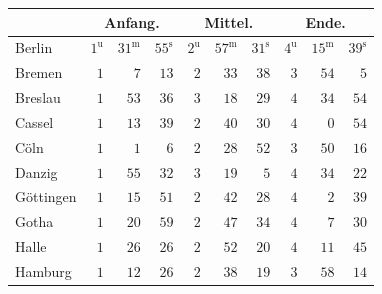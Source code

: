 \begin{center}\small\setlength{\tabcolsep}{3pt}
\begin{tabular}{l|rrr|rrr|rrr}
 &  \multicolumn{3}{c|}{Anfang.}  &  \multicolumn{3}{c|}{Mittel.}  &  \multicolumn{3}{c|}{Ende.}  \\
\hline
Berlin  &  $1^{\mathrm u}$  &  $31^{\mathrm m}$  &  $55^{\mathrm s}$  &  $2^{\mathrm u}$  &  $57^{\mathrm m}$  &  $31^{\mathrm s}$  &  $4^{\mathrm u}$  &  $15^{\mathrm m}$  &  $39^{\mathrm s}$  \\
Bremen  &  $1$  &  $7$  &  $13$  &  $2$  &  $33$  &  $38$  &  $3$  &  $54$  &  $5$  \\
Breslau  &  $1$  &  $53$  &  $36$  &  $3$  &  $18$  &  $29$  &  $4$  &  $34$  &  $54$  \\
Cassel  &  $1$  &  $13$  &  $39$  &  $2$  &  $40$  &  $30$  &  $4$  &  $0$  &  $54$  \\
Cöln  &  $1$  &  $1$  &  $6$  &  $2$  &  $28$  &  $52$  &  $3$  &  $50$  &  $16$  \\
Danzig  &  $1$  &  $55$  &  $32$  &  $3$  &  $19$  &  $5$  &  $4$  &  $34$  &  $22$  \\
Göttingen  &  $1$  &  $15$  &  $51$  &  $2$  &  $42$  &  $28$  &  $4$  &  $2$  &  $39$  \\
Gotha  &  $1$  &  $20$  &  $59$  &  $2$  &  $47$  &  $34$  &  $4$  &  $7$  &  $30$  \\
Halle  &  $1$  &  $26$  &  $26$  &  $2$  &  $52$  &  $20$  &  $4$  &  $11$  &  $45$  \\
Hamburg  &  $1$  &  $12$  &  $26$  &  $2$  &  $38$  &  $19$  &  $3$  &  $58$  &  $14$  \\
\end{tabular}
\end{center}

